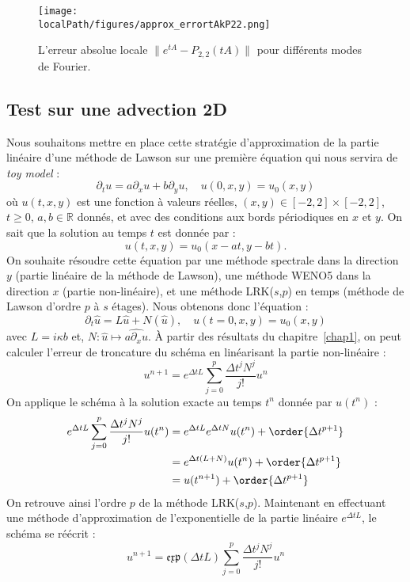 \begin{figure}
  \centering
  \texttt{[image: \\localPath/figures/approx\_errortAkP22.png]}
  \caption{L'erreur absolue locale $\|e^{tA}-P_{2,2}(tA)\|$ pour différents modes de Fourier.}
  \label{fig:pade:error22}
\end{figure}


\subsection{Test sur une advection 2D}

Nous souhaitons mettre en place cette stratégie d'approximation de la partie linéaire d'une méthode de Lawson sur une première équation qui nous servira de \emph{toy model} :
$$
  \partial_t u = a\partial_x u + b\partial_y u,\quad u(0,x,y)=u_0(x,y)
$$
où $u(t,x,y)$ est une fonction à valeurs réelles, $(x,y)\in[-2,2]\times[-2,2]$, $t\geq0$, $a,b\in\mathbb{R}$ donnés, et avec des conditions aux bords périodiques en $x$ et $y$. On sait que la solution au temps $t$ est donnée par :
$$
  u(t,x,y) = u_0(x-at,y-bt).
$$
On souhaite résoudre cette équation par une méthode spectrale dans la direction $y$ (partie linéaire de la méthode de Lawson), une méthode WENO5 dans la direction $x$ (partie non-linéaire), et une méthode LRK($s$,$p$) en temps (méthode de Lawson d'ordre $p$ à $s$ étages). Nous obtenons donc l'équation :
$$
  \partial_t \hat{u} = L\hat{u} + N(\hat{u}),\quad u(t=0,x,y) = u_0(x,y)
$$
avec $L = i\kappa b$ et, $N:\hat{u}\mapsto\widehat{a\partial_xu}$. À partir des résultats du chapitre~\ref{chap1}, on peut calculer l'erreur de troncature du schéma en linéarisant la partie non-linéaire :
$$
  u^{n+1} = e^{\Delta tL}\sum_{j=0}^{p}\frac{\Delta t^jN^j}{j!}u^n
$$
On applique le schéma à la solution exacte au temps $t^n$ donnée par $u(t^n)$ :
$$
  \begin{aligned}
    e^{\Delta tL}\sum_{j=0}^{p}\frac{\Delta t^jN^j}{j!}u(t^n) &= e^{\Delta t L}e^{\Delta t N}u(t^n) + \order{\Delta t^{p+1}} \\
      &= e^{\Delta t(L+N)}u(t^n) + \order{\Delta t^{p+1}} \\
      &= u(t^{n+1}) + \order{\Delta t^{p+1}}
  \end{aligned}
$$
On retrouve ainsi l'ordre $p$ de la méthode LRK($s$,$p$). Maintenant en effectuant une méthode d'approximation de l'exponentielle de la partie linéaire $e^{\Delta tL}$, le schéma se réécrit :
$$
  u^{n+1} = \mathfrak{exp}(\Delta tL)\sum_{j=0}^{p}\frac{\Delta t^jN^j}{j!}u^n
$$
